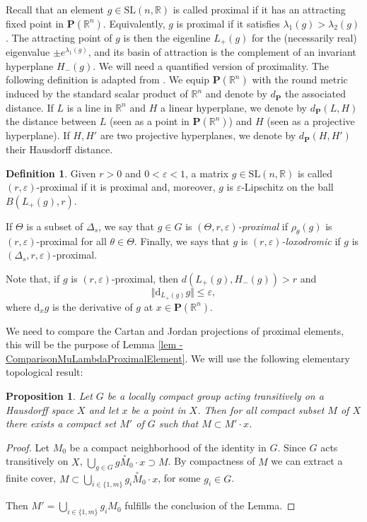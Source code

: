 \documentclass[JEP,XML,SOM,Unicode,NoEqCountersInSection,NoFloatCountersInSection,published]{cedram}
\newtheorem{prop}[theo]{Proposition}
\theoremstyle{definition}
\newtheorem{defi}[theo]{Definition}
\newcommand{\proj}{\mathbf{P}}
\newcommand{\R}{\mathbb{R}}
\newcommand{\SL}{\mathrm{SL}}
\let\epsilon\varepsilon
\begin{document}
Recall that an element $g\in \SL(n,\R)$ is called proximal if it has an attracting fixed point in $\proj(\R^n)$. Equivalently, $g$ is proximal if it satisfies $\lambda_1(g)> \lambda_2(g)$. The attracting point of $g$ is then the eigenline $L_+(g)$ for the (necessarily real) eigenvalue $\pm e^{\lambda_1(g)}$, and its basin of attraction is the complement of an invariant hyperplane $H_-(g)$. We will need a quantified version of proximality. The following definition is adapted from \cite[Def.\,5.6]{guichard2012anosov}. We equip $\proj(\R^n)$ with the round metric induced by the standard scalar product of $\R^n$ and denote by $d_\proj$ the associated distance. If $L$ is a line in $\R^n$ and $H$ a linear hyperplane, we denote by $d_\proj(L,H)$ the distance between $L$ (seen as a point in $\proj (\R^n)$) and $H$ (seen as a projective hyperplane). If $H,H'$ are two projective hyperplanes, we denote by $d_\proj(H,H')$ their Hausdorff distance.

\begin{defi} \label{def - proximality}
Given $r>0$ and $0<\epsilon<1$, a matrix $g\in \SL(n,\R)$ is called $(r,\epsilon)$\nobreakdash-prox\-imal if it is proximal and, moreover, $g$ is $\epsilon$-Lipschitz on the ball $B(L_+(g),r)$.

If $\Theta$ is a subset of $\Delta_s$, we say that $g\in G$ is \emph{$(\Theta,r,\epsilon)$\nobreakdash-prox\-imal} if $\rho_\theta(g)$ is $(r,\epsilon)$\nobreakdash-prox\-imal for all $\theta\in \Theta$. Finally, we says that $g$ is \emph{$(r,\epsilon)$-loxodromic} if $g$ is $(\Delta_s,r,\epsilon)$\nobreakdash-prox\-imal.
\end{defi}

Note that, if $g$ is $(r,\epsilon)$-proximal, then $d(L_+(g),H_-(g)) >r$ and
\[\Vert \mathrm d_{L_+(g)}g\Vert \leq \epsilon,\]
where $\mathrm d_xg$ is the derivative of $g$ at $x\in \mathbf P(\R^n)$.

We need to compare the Cartan and Jordan projections of proximal elements, this will be the purpose of Lemma \ref{lem - ComparisonMuLambdaProximalElement}. We will use the following elementary topological result:
\begin{prop}\label{lem- compactity of loc compact transitive action}
Let $G$ be a locally compact group acting transitively on a Hausdorff space $X$ and let $x$ be a point in $X$. Then for all compact subset $M$ of $X$ there exists a compact set $M'$ of $G$ such that
$M\subset M' \cdot x $.
\end{prop}

\begin{proof}
Let $M_0$ be a compact neighborhood of the identity in $G$. Since $G$ acts transitively on $X$, $\bigcup_{g\in G} g\overset{\circ}{M}_0 \cdot x \supset M$. By compactness of $M$ we can extract a finite cover, $M\subset \bigcup_{i\in \{1, m\}} g_i \overset{\circ}{M}_0 \cdot x $, for some $g_i \in G$.

Then $M' = \bigcup_{i\in \{1, m\}} g_i M_0$ fulfills the conclusion of the Lemma.
\end{proof}
\end{document}
